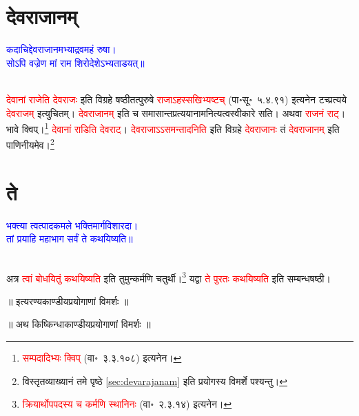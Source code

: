 \section[देवराजानम्]{देवराजानम्‌}
\centering\textcolor{blue}{कदाचिद्देवराजानमभ्याद्रवमहं रुषा।\nopagebreak\\
सोऽपि वज्रेण मां राम शिरोदेशेऽभ्यताडयत्॥}\nopagebreak\\
\\
\begin{sloppypar}\justifying\noindent\hspace{10mm} \textcolor{red}{देवानां राजेति देवराजः} इति विग्रहे षष्ठी\-तत्पुरुषे \textcolor{red}{राजाऽहस्सखिभ्यष्टच्‌} (पा॰सू॰~५.४.९१) इत्यनेन टच्प्रत्यये \textcolor{red}{देवराजम्‌} इत्युचितम्। \textcolor{red}{देव\-राजानम्‌} इति च समासान्त\-प्रत्ययानामनित्यत्व\-स्वीकारे सति। अथवा \textcolor{red}{राजनं राट्‌}। भावे क्विप्।\footnote{\textcolor{red}{सम्पदादिभ्‍यः क्विप्‌} (वा॰~३.३.१०८) इत्यनेन।} \textcolor{red}{देवानां राडिति देवराट्‌}। \textcolor{red}{देवराजाऽऽसमन्तादनिति} इति विग्रहे \textcolor{red}{देवराजानः} तं \textcolor{red}{देवराजानम्‌} इति पाणिनीयमेव।\footnote{विस्तृत\-व्याख्यानं \pageref{sec:devarajanam}तमे पृष्ठे \ref{sec:devarajanam}  इति प्रयोगस्य विमर्शे पश्यन्तु।}\end{sloppypar}
\section[ते]{ते}
\centering\textcolor{blue}{भक्त्या त्वत्पादकमले भक्तिमार्गविशारदा।\nopagebreak\\
तां प्रयाहि महाभाग सर्वं ते कथयिष्यति॥}\nopagebreak\\
\\
\begin{sloppypar}\justifying\noindent\hspace{10mm} अत्र \textcolor{red}{त्वां बोधयितुं कथयिष्यति} इति तुमुन्कर्मणि चतुर्थी।\footnote{\textcolor{red}{क्रियार्थोपपदस्य च कर्मणि स्थानिनः} (वा॰~२.३.१४) इत्यनेन।} यद्वा \textcolor{red}{ते पुरतः कथयिष्यति} इति सम्बन्ध\-षष्ठी।\end{sloppypar}
\vspace{2mm}
\centering ॥ इत्यरण्यकाण्डीयप्रयोगाणां विमर्शः ॥\nopagebreak\\
\vspace{4mm}
{}
\centering ॥ अथ किष्किन्धाकाण्डीयप्रयोगाणां विमर्शः ॥\nopagebreak\\
